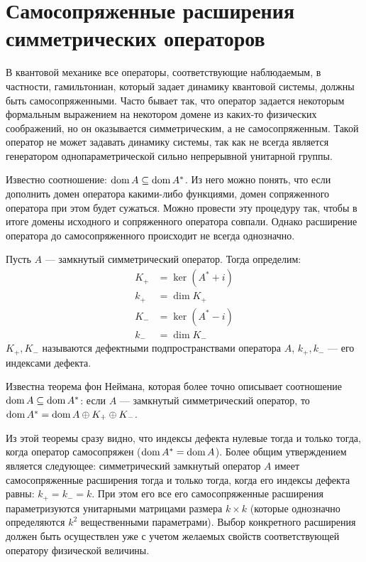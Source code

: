 \section{Самосопряженные расширения симметрических операторов}
В квантовой механике все операторы, соответствующие наблюдаемым, в частности, гамильтониан, который задает динамику квантовой системы, должны быть самосопряженными. Часто бывает так, что оператор задается некоторым формальным выражением на некотором домене из каких-то физических соображений, но он оказывается симметрическим, а не самосопряженным. Такой оператор не может задавать динамику системы, так как не всегда является генератором однопараметрической сильно непрерывной унитарной группы.

Известно соотношение: $\operatorname{dom} A \subseteq \operatorname{dom} A^*$. Из него можно понять, что если дополнить домен оператора какими-либо функциями, домен сопряженного оператора при этом будет сужаться. Можно провести эту процедуру так, чтобы в итоге домены исходного и сопряженного оператора совпали. Однако расширение оператора до самосопряженного происходит не всегда однозначно.

Пусть $A$ — замкнутый симметрический оператор. Тогда определим:
\begin{align*}
K_+ &= \ker (A^* + i) \\
k_+ &= \dim K_+ \\
K_- &= \ker (A^* - i) \\
k_- &= \dim K_-
\end{align*}
$K_+, K_-$ называются дефектными подпространствами оператора $A$, $k_+, k_-$ — его индексами дефекта.

Известна теорема фон Неймана, которая более точно описывает соотношение $\operatorname{dom} A \subseteq \operatorname{dom} A^*$: если $A$ — замкнутый симметрический оператор, то $\operatorname{dom} A^* = \operatorname{dom} A \oplus K_+ \oplus K_-$.

Из этой теоремы сразу видно, что индексы дефекта нулевые тогда и только тогда, когда оператор самосопряжен ($\operatorname{dom} A^* = \operatorname{dom} A$). Более общим утверждением является следующее: симметрический замкнутый оператор $A$ имеет самосопряженные расширения тогда и только тогда, когда его индексы дефекта равны: $k_+ = k_- = k$. При этом его все его самосопряженные расширения параметризуются унитарными матрицами размера $k \times k$ (которые однозначно определяются $k^2$ вещественными параметрами). Выбор конкретного расширения должен быть осуществлен уже с учетом желаемых свойств соответствующей оператору физической величины.
